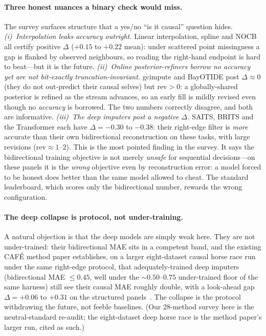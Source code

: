 \documentclass[10pt,twocolumn]{article}
\newcommand{\cafe}{CAF\'E}
\begin{document}
\paragraph{Three honest nuances a binary check would miss.} The survey surfaces
structure that a yes/no ``is it causal'' question hides.
\emph{(i)~Interpolation leaks accuracy outright.} Linear interpolation, spline
and NOCB all certify positive $\Delta$ ($+0.15$ to $+0.22$ mean): under scattered
point missingness a gap is flanked by observed neighbours, so reading the
right-hand endpoint is hard to beat---but it is the future. \emph{(ii)~Online
posterior-refiners borrow no accuracy yet are not bit-exactly
truncation-invariant.} gcimpute and BayOTIDE post $\Delta\approx0$ (they do not
out-predict their causal selves) but $\mathrm{rev}>0$: a globally-shared
posterior is refined as the stream advances, so an early fill is mildly revised
even though no \emph{accuracy} is borrowed. The two numbers correctly disagree,
and both are informative. \emph{(iii)~The deep imputers post a \emph{negative}
$\Delta$.} SAITS, BRITS and the Transformer each have $\Delta=-0.30$ to $-0.38$:
their right-edge filter is \emph{more} accurate than their own bidirectional
reconstruction on these tasks, with large revisions ($\mathrm{rev}\!\approx\!1$--$2$).
This is the most pointed finding in the survey. It says the bidirectional
training objective is not merely \emph{unsafe} for sequential decisions---on
these panels it is the \emph{wrong} objective even by reconstruction error: a
model forced to be honest does better than the same model allowed to cheat. The
standard leaderboard, which scores only the bidirectional number, rewards the
wrong configuration.

\paragraph{The deep collapse is protocol, not under-training.} A natural
objection is that the deep models are simply weak here. They are not
under-trained: their bidirectional MAE sits in a competent band, and the existing
\cafe{} method paper establishes, on a larger eight-dataset causal horse race run
under the same right-edge protocol, that adequately-trained deep imputers
(bidirectional MAE $\le0.45$, well under the $\sim\!0.50$--$0.75$ under-trained
floor of the same harness) still see their causal MAE roughly double, with a
look-ahead gap $\Delta=+0.06$ to $+0.31$ on the structured panels~\cite[Tab.~``baseline
fairness'' and ``horserace\_bidir'']{snow2025cafe}. The collapse is the protocol
withdrawing the future, not feeble baselines. (Our $28$-method survey here is the
neutral-standard re-audit; the eight-dataset deep horse race is the method paper's
larger run, cited as such.)
\end{document}
